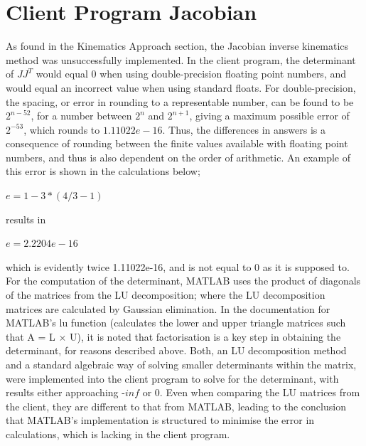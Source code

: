 \documentclass[12pt,openany,a4paper]{book}
\begin{document}
\section{Client Program Jacobian}
As found in the Kinematics Approach section, the Jacobian inverse kinematics method was unsuccessfully implemented. In the client program, the determinant of $JJ^T$ would equal 0 when using double-precision floating point numbers, and would equal an incorrect value when using standard floats. For double-precision, the spacing, or error in rounding to a representable number, can be found to be $2^{n-52}$, for a number between $2^n$ and $2^{n+1}$, giving a maximum possible error of $2^{-53}$, which rounds to $1.11022e-16$. Thus, the differences in answers is a consequence of rounding between the finite values available with floating point numbers, and thus is also dependent on the order of arithmetic. An example of this error is shown in the calculations below;

$e = 1 - 3*(4/3 - 1)$

results in
 
$e =  2.2204e-16$

which is evidently twice 1.11022e-16, and is not equal to 0 as it is supposed to. For the computation of the determinant, MATLAB uses the product of diagonals of the matrices from the LU decomposition; where the LU decomposition matrices are calculated by Gaussian elimination. In the documentation for MATLAB's lu function (calculates the lower and upper triangle matrices such that A = L $\times$ U), it is noted that factorisation is a key step in obtaining the determinant, for reasons described above. Both, an LU decomposition method and a standard algebraic way of solving smaller determinants within the matrix, were implemented into the client program to solve for the determinant, with results either approaching -$inf$ or 0. Even when comparing the LU matrices from the client, they are different to that from MATLAB, leading to the conclusion that MATLAB's implementation is structured to minimise the error in calculations, which is lacking in the client program.
\end{document}
